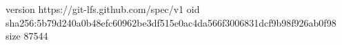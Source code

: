 version https://git-lfs.github.com/spec/v1
oid sha256:5b79d240a0b48efc60962be3df515e0ac4da566f3006831dcf9b98f926ab0f98
size 87544
